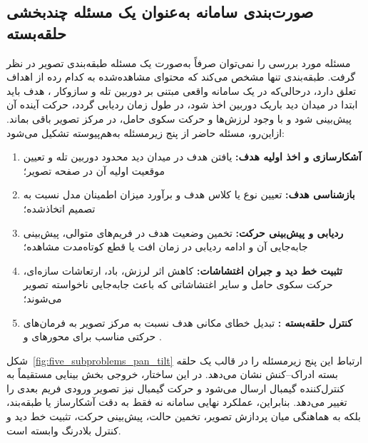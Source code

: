 \documentclass[12pt,a4paper]{article}
\begin{document}
\subsection{صورت‌بندی سامانه به‌عنوان یک مسئله چندبخشی حلقه‌بسته}
\label{subsec:closed_loop_problem_formulation}

مسئله مورد بررسی را نمی‌توان صرفاً به‌صورت یک مسئله طبقه‌بندی تصویر
در نظر گرفت. طبقه‌بندی تنها مشخص می‌کند که محتوای مشاهده‌شده به کدام
رده از اهداف تعلق دارد، درحالی‌که در یک سامانه واقعی مبتنی بر دوربین
تله و سازوکار ، هدف باید ابتدا در میدان دید باریک دوربین
اخذ شود، در طول زمان ردیابی گردد، حرکت آینده آن پیش‌بینی شود و با وجود
لرزش‌ها و حرکت سکوی حامل، در مرکز تصویر باقی بماند. ازاین‌رو، مسئله
حاضر از پنج زیرمسئله به‌هم‌پیوسته تشکیل می‌شود:

\begin{enumerate}
	\item \textbf{آشکارسازی و اخذ اولیه هدف:}
	یافتن هدف در میدان دید محدود دوربین تله و تعیین موقعیت اولیه آن
	در صفحه تصویر؛
	
	\item \textbf{بازشناسی هدف:}
	تعیین نوع یا کلاس هدف و برآورد میزان اطمینان مدل نسبت به تصمیم
	اتخاذشده؛
	
	\item \textbf{ردیابی و پیش‌بینی حرکت:}
	تخمین وضعیت هدف در فریم‌های متوالی، پیش‌بینی جابه‌جایی آن و
	ادامه ردیابی در زمان افت یا قطع کوتاه‌مدت مشاهده؛
	
	\item \textbf{تثبیت خط دید و جبران اغتشاشات:}
	کاهش اثر لرزش، باد، ارتعاشات سازه‌ای، حرکت سکوی حامل و سایر
	اغتشاشاتی که باعث جابه‌جایی ناخواسته تصویر می‌شوند؛
	
	\item \textbf{کنترل حلقه‌بسته :}
	تبدیل خطای مکانی هدف نسبت به مرکز تصویر به فرمان‌های حرکتی
	مناسب برای محورهای  و .
\end{enumerate}

شکل~\ref{fig:five_subproblems_pan_tilt} ارتباط این پنج زیرمسئله را
در قالب یک حلقه بسته ادراک--کنش نشان می‌دهد. در این ساختار، خروجی
بخش بینایی مستقیماً به کنترل‌کننده گیمبال ارسال می‌شود و حرکت گیمبال
نیز تصویر ورودی فریم بعدی را تغییر می‌دهد. بنابراین، عملکرد نهایی
سامانه نه فقط به دقت آشکارساز یا طبقه‌بند، بلکه به هماهنگی میان
پردازش تصویر، تخمین حالت، پیش‌بینی حرکت، تثبیت خط دید و کنترل
بلادرنگ وابسته است.
\end{document}
